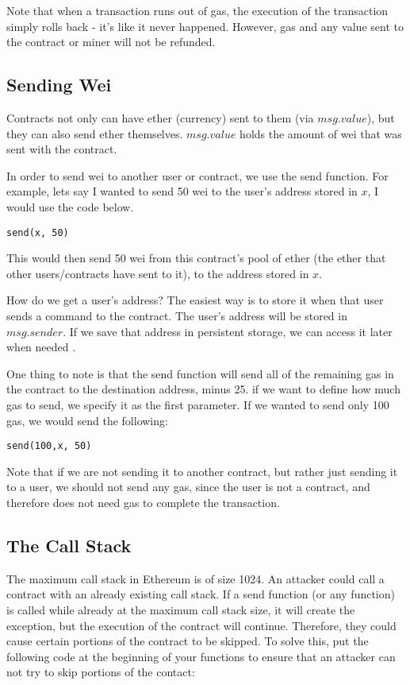 \documentclass[12pt]{article}
\begin{document}
Note that when a transaction runs out of gas, the execution of the transaction simply rolls back - it's like it never happened. However, gas and any value sent to the contract or miner will not be refunded. \cite{Subtleties, WhatOptions}

\subsection{Sending Wei}
Contracts not only can have ether (currency) sent to them (via $msg.value$), but they can also send ether themselves. $msg.value$ holds the amount of wei that was sent with the contract.

In order to send wei to another user or contract, we use the send function. For example, lets say I wanted to send 50 wei to the user's address stored in $x$, I would use the code below.

\begin{verbatim}
send(x, 50)
\end{verbatim}

This would then send 50 wei from this contract's pool of ether (the ether that other users/contracts have sent to it), to the address stored in $x$.

How do we get a user's address? The easiest way is to store it when that user sends a command to the contract. The user's address will be stored in $msg.sender$. If we save that address in persistent storage, we can access it later when needed \cite{Serpent}.

One thing to note is that the send function will send all of the remaining gas in the contract to the destination address, minus 25. if we want to define how much gas to send, we specify it as the first parameter. If we wanted to send only 100 gas, we would send the following: 

\begin{verbatim}
send(100,x, 50)
\end{verbatim}

Note that if we are not sending it to another contract, but rather just sending it to a user, we should not send any gas, since the user is not a contract, and therefore does not need gas to complete the transaction. 

\subsection{The Call Stack}

The maximum call stack in Ethereum is of size 1024. An attacker could call a contract with an already existing call stack. If a send function (or any function) is called while already at the maximum call stack size, it will create the exception, but the execution of the contract will continue. Therefore, they could cause certain portions of the contract to be skipped. To solve this, put the following code at the beginning of your functions to ensure that an attacker can not try to skip portions of the contact:
\end{document}
